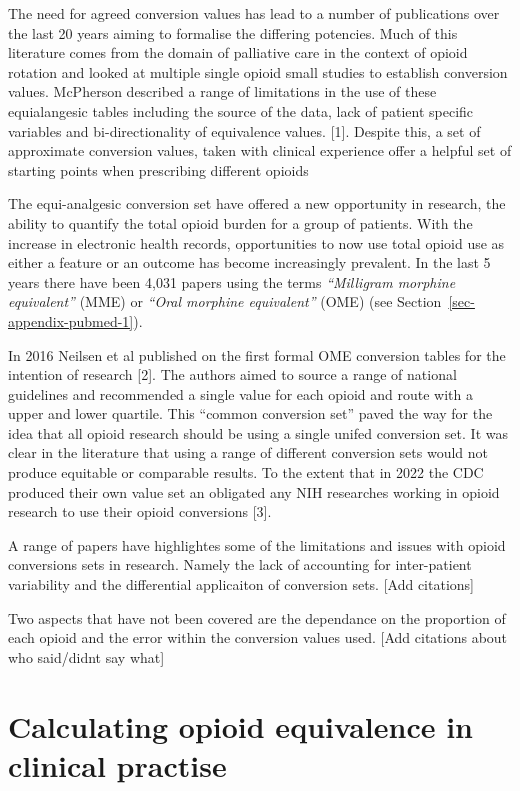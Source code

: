 \documentclass[
  letterpaper,
  DIV=11,
  numbers=noendperiod]{scrreprt}
\begin{document}
The need for agreed conversion values has lead to a number of
publications over the last 20 years aiming to formalise the differing
potencies. Much of this literature comes from the domain of palliative
care in the context of opioid rotation and looked at multiple single
opioid small studies to establish conversion values. McPherson described
a range of limitations in the use of these equialangesic tables
including the source of the data, lack of patient specific variables and
bi-directionality of equivalence values. {[}1{]}. Despite this, a set of
approximate conversion values, taken with clinical experience offer a
helpful set of starting points when prescribing different opioids

The equi-analgesic conversion set have offered a new opportunity in
research, the ability to quantify the total opioid burden for a group of
patients. With the increase in electronic health records, opportunities
to now use total opioid use as either a feature or an outcome has become
increasingly prevalent. In the last 5 years there have been 4,031 papers
using the terms \emph{``Milligram morphine equivalent''} (MME) or
\emph{``Oral morphine equivalent''} (OME) (see
Section~\ref{sec-appendix-pubmed-1}).

In 2016 Neilsen et al published on the first formal OME conversion
tables for the intention of research {[}2{]}. The authors aimed to
source a range of national guidelines and recommended a single value for
each opioid and route with a upper and lower quartile. This ``common
conversion set'' paved the way for the idea that all opioid research
should be using a single unifed conversion set. It was clear in the
literature that using a range of different conversion sets would not
produce equitable or comparable results. To the extent that in 2022 the
CDC produced their own value set an obligated any NIH researches working
in opioid research to use their opioid conversions {[}3{]}.

A range of papers have highlightes some of the limitations and issues
with opioid conversions sets in research. Namely the lack of accounting
for inter-patient variability and the differential applicaiton of
conversion sets. {[}Add citations{]}

Two aspects that have not been covered are the dependance on the
proportion of each opioid and the error within the conversion values
used. {[}Add citations about who said/didnt say what{]}

\section{Calculating opioid equivalence in clinical
practise}\label{calculating-opioid-equivalence-in-clinical-practise}
\end{document}

